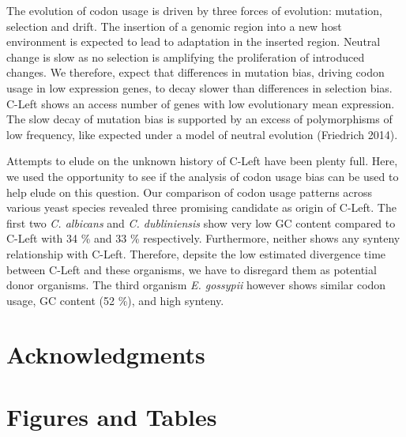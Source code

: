 \documentclass[letter,12pt]{article}
\begin{document}
The evolution of codon usage is driven by three forces of evolution: mutation, selection and drift.
The insertion of a genomic region into a new host environment is expected to lead to adaptation in the inserted region.
Neutral change is slow as no selection is amplifying the proliferation of introduced changes.
We therefore, expect that differences in mutation bias, driving codon usage in low expression genes, to decay slower than differences in selection bias.
C-Left shows an access number of genes with low evolutionary mean expression.
The slow decay of mutation bias is supported by an excess of polymorphisms of low frequency, like expected under a model of neutral evolution (Friedrich 2014).

Attempts to elude on the unknown history of C-Left have been plenty full.
Here, we used the opportunity to see if the analysis of codon usage bias can be used to help elude on this question.
Our comparison of codon usage patterns across various yeast species revealed three promising candidate as origin of C-Left.
The first two \textit{C. albicans} and \textit{C. dubliniensis} show very low GC content compared to C-Left with 34 \% and 33 \% respectively. 
Furthermore, neither shows any synteny relationship with C-Left.
Therefore, depsite the low estimated divergence time between C-Left and these organisms, we have to disregard them as potential donor organisms. 
The third organism \textit{E. gossypii} however shows similar codon usage, GC content (52 \%), and high synteny.  

\section{Acknowledgments}


%



\section{Figures and Tables}
\end{document}
